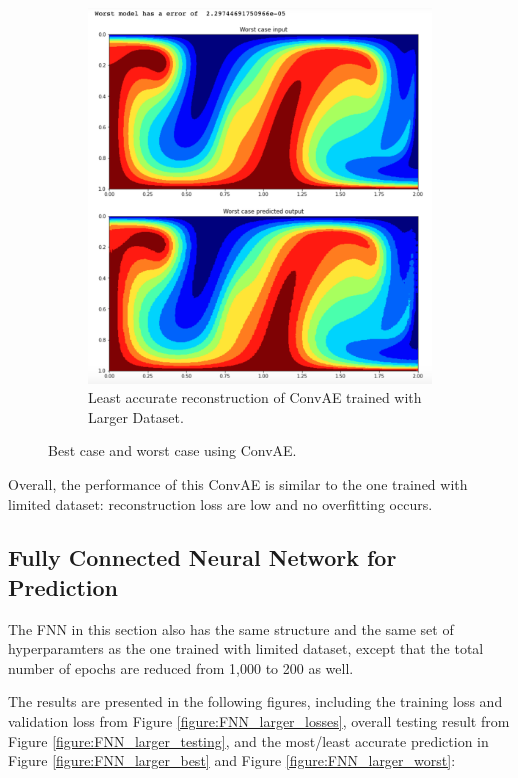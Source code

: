 \begin{figure}[H]
\begin{subfigure}{0.45\textwidth}
    \includegraphics[width=\textwidth]{figures/mantle_convection_images/larger_dataset/ConvAE_Worst.png}
    \caption{Least accurate reconstruction of ConvAE trained with Larger Dataset.}
\end{subfigure}   
\caption{Best case and worst case using ConvAE.}
\label{figure:ConvAE_larger_best_worst}
\end{figure}

Overall, the performance of this ConvAE is similar to the one trained with limited dataset: reconstruction loss are low and no overfitting occurs.


\subsection{Fully Connected Neural Network for Prediction}

The FNN in this section also has the same structure and the same set of hyperparamters as the one trained with limited dataset, except that the total number of epochs are reduced from 1,000 to 200 as well.

The results are presented in the following figures, including the training loss and validation loss from Figure \ref{figure:FNN_larger_losses}, overall testing result from Figure \ref{figure:FNN_larger_testing}, and the most/least accurate prediction in Figure \ref{figure:FNN_larger_best} and Figure \ref{figure:FNN_larger_worst}:


